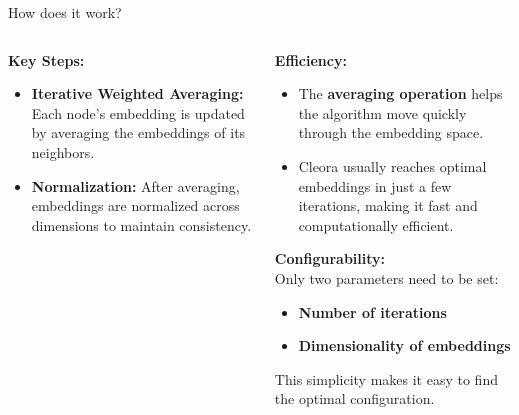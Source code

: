 \begin{frame}{How does it work?}

\begin{columns}
    \begin{column}{0.5\textwidth}
        \textbf{Key Steps:}
        \begin{itemize}
            \item \textbf{Iterative Weighted Averaging:} 
            Each node's embedding is updated by averaging the embeddings of its neighbors.
            \item \textbf{Normalization:}
            After averaging, embeddings are normalized across dimensions to maintain consistency.
        \end{itemize}
    \end{column}

    \begin{column}{0.5\textwidth}
        \textbf{Efficiency:}
        \begin{itemize}
            \item The \textbf{averaging operation} helps the algorithm move quickly through the embedding space.
            \item Cleora usually reaches optimal embeddings in just a few iterations, making it fast and computationally efficient.
        \end{itemize}
        \textbf{Configurability:} \\
        Only two parameters need to be set:
        \begin{itemize}
            \item \textbf{Number of iterations}
            \item \textbf{Dimensionality of embeddings}
        \end{itemize}
        This simplicity makes it easy to find the optimal configuration.
    \end{column}
\end{columns}

\end{frame}
